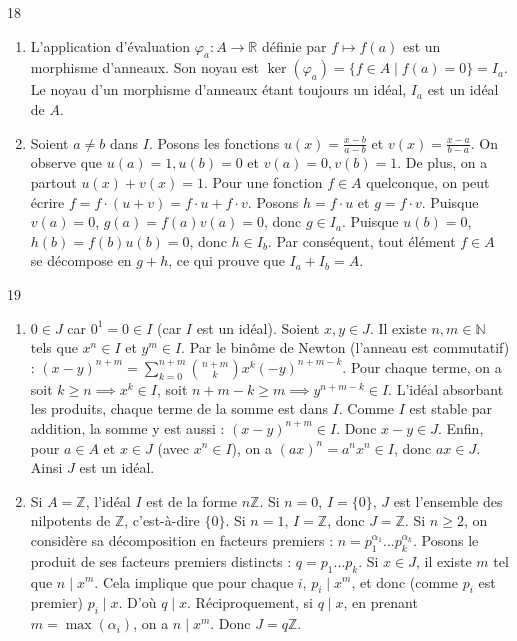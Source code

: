 \begin{correction}{18}
\begin{enumerate}
 \item[a)] L'application d'évaluation $\varphi_a : A \to \mathbb{R}$ définie par $f \mapsto f(a)$ est un morphisme d'anneaux. 
 Son noyau est $\ker(\varphi_a) = \{f \in A \mid f(a) = 0\} = I_a$. 
 Le noyau d'un morphisme d'anneaux étant toujours un idéal, $I_a$ est un idéal de $A$. 
 
 \item[b)] Soient $a \neq b$ dans $I$. Posons les fonctions $u(x) = \frac{x-b}{a-b}$ et $v(x) = \frac{x-a}{b-a}$. 
 On observe que $u(a)=1, u(b)=0$ et $v(a)=0, v(b)=1$. De plus, on a partout $u(x)+v(x)=1$. 
 Pour une fonction $f \in A$ quelconque, on peut écrire $f = f \cdot (u + v) = f \cdot u + f \cdot v$. 
 Posons $h = f \cdot u$ et $g = f \cdot v$. 
 Puisque $v(a) = 0$, $g(a) = f(a)v(a) = 0$, donc $g \in I_a$. 
 Puisque $u(b) = 0$, $h(b) = f(b)u(b) = 0$, donc $h \in I_b$. 
 Par conséquent, tout élément $f \in A$ se décompose en $g+h$, ce qui prouve que $I_a + I_b = A$. 
\end{enumerate}
\end{correction}

\begin{correction}{19}
\begin{enumerate}
 \item $0 \in J$ car $0^1 = 0 \in I$ (car $I$ est un idéal). 
 Soient $x, y \in J$. Il existe $n, m \in \mathbb{N}$ tels que $x^n \in I$ et $y^m \in I$. 
 Par le binôme de Newton (l'anneau est commutatif) : $(x-y)^{n+m} = \sum_{k=0}^{n+m} \binom{n+m}{k} x^k (-y)^{n+m-k}$. 
 Pour chaque terme, on a soit $k \ge n \implies x^k \in I$, soit $n+m-k \ge m \implies y^{n+m-k} \in I$. 
 L'idéal absorbant les produits, chaque terme de la somme est dans $I$. Comme $I$ est stable par addition, la somme y est aussi : $(x-y)^{n+m} \in I$. Donc $x-y \in J$. 
 Enfin, pour $a \in A$ et $x \in J$ (avec $x^n \in I$), on a $(ax)^n = a^n x^n \in I$, donc $ax \in J$. Ainsi $J$ est un idéal. 
 
 \item Si $A = \mathbb{Z}$, l'idéal $I$ est de la forme $n\mathbb{Z}$. 
 Si $n=0$, $I=\{0\}$, $J$ est l'ensemble des nilpotents de $\mathbb{Z}$, c'est-à-dire $\{0\}$. 
 Si $n=1$, $I=\mathbb{Z}$, donc $J=\mathbb{Z}$. 
 Si $n \ge 2$, on considère sa décomposition en facteurs premiers : $n = p_1^{\alpha_1} \dots p_k^{\alpha_k}$. 
 Posons le produit de ses facteurs premiers distincts : $q = p_1 \dots p_k$. 
 Si $x \in J$, il existe $m$ tel que $n \mid x^m$. Cela implique que pour chaque $i$, $p_i \mid x^m$, et donc (comme $p_i$ est premier) $p_i \mid x$. D'où $q \mid x$. 
 Réciproquement, si $q \mid x$, en prenant $m = \max(\alpha_i)$, on a $n \mid x^m$. 
 Donc $J = q\mathbb{Z}$. 
\end{enumerate}
\end{correction}

